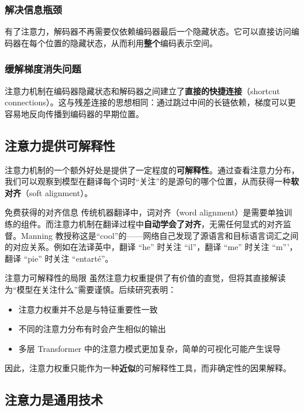 \subsubsection{解决信息瓶颈}

有了注意力，解码器不再需要仅依赖编码器最后一个隐藏状态。它可以直接访问编码器在每个位置的隐藏状态，从而利用\textbf{整个}编码表示空间。

\subsubsection{缓解梯度消失问题}

注意力机制在编码器隐藏状态和解码器之间建立了\textbf{直接的快捷连接}（shortcut connections）。这与残差连接的思想相同：通过跳过中间的长链依赖，梯度可以更容易地反向传播到编码器的早期位置。

\subsection{注意力提供可解释性}

注意力机制的一个额外好处是提供了一定程度的\textbf{可解释性}。通过查看注意力分布，我们可以观察到模型在翻译每个词时``关注''的是源句的哪个位置，从而获得一种\textbf{软对齐}（soft alignment）。

\begin{knowledgebox}{免费获得的对齐信息}
传统机器翻译中，词对齐（word alignment）是需要单独训练的组件。而注意力机制在翻译过程中\textbf{自动学会了对齐}，无需任何显式的对齐监督。Manning 教授称这是``cool''的——网络自己发现了源语言和目标语言词汇之间的对应关系。例如在法译英中，翻译 ``he'' 时关注 ``il''，翻译 ``me'' 时关注 ``m'''，翻译 ``pie'' 时关注 ``entart\'{e}''。
\end{knowledgebox}

\begin{warningbox}{注意力可解释性的局限}
虽然注意力权重提供了有价值的直觉，但将其直接解读为``模型在关注什么''需要谨慎。后续研究表明：
\begin{itemize}
    \item 注意力权重并不总是与特征重要性一致
    \item 不同的注意力分布有时会产生相似的输出
    \item 多层 Transformer 中的注意力模式更加复杂，简单的可视化可能产生误导
\end{itemize}
因此，注意力权重只能作为一种\textbf{近似}的可解释性工具，而非确定性的因果解释。
\end{warningbox}

\subsection{注意力是通用技术}

